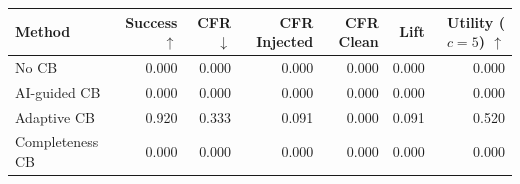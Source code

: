 \begin{tabular}{lrrrrrr}
\toprule
Method & Success $\uparrow$ & CFR $\downarrow$ & CFR Injected & CFR Clean & Lift & Utility ($c=5$) $\uparrow$ \\
\midrule
No CB & 0.000 & 0.000 & 0.000 & 0.000 & 0.000 & 0.000 \\
AI-guided CB & 0.000 & 0.000 & 0.000 & 0.000 & 0.000 & 0.000 \\
Adaptive CB & 0.920 & 0.333 & 0.091 & 0.000 & 0.091 & 0.520 \\
Completeness CB & 0.000 & 0.000 & 0.000 & 0.000 & 0.000 & 0.000 \\
\bottomrule
\end{tabular}
